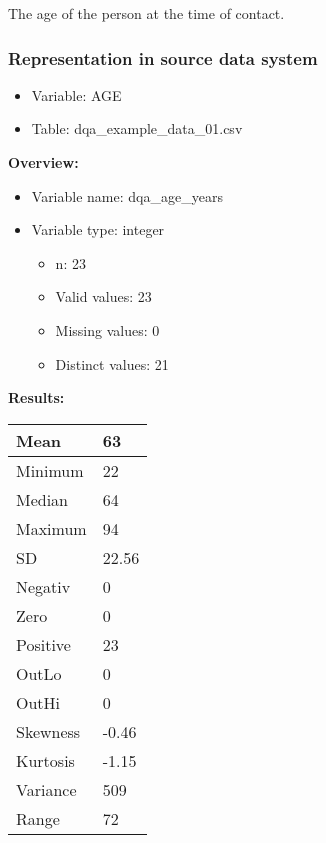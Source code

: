 \documentclass[
]{article}
\providecommand{\tightlist}{%
  \setlength{\itemsep}{0pt}\setlength{\parskip}{0pt}}
\begin{document}
The age of the person at the time of contact.

\hypertarget{representation-in-source-data-system}{%
\subsubsection{\texorpdfstring{Representation in \textbf{source} data
system}{Representation in source data system}}\label{representation-in-source-data-system}}

\begin{itemize}
\tightlist
\item
  Variable: AGE
\item
  Table: dqa\_example\_data\_01.csv
\end{itemize}

\textbf{Overview:}

\begin{itemize}
\tightlist
\item
  Variable name: dqa\_age\_years
\item
  Variable type: integer

  \begin{itemize}
  \tightlist
  \item
    n: 23
  \item
    Valid values: 23
  \item
    Missing values: 0
  \item
    Distinct values: 21
  \end{itemize}
\end{itemize}

\textbf{Results:}\\

\begin{table}[H]
\centering
\begin{tabular}{l|l}
\hline
Mean & 63\\
\hline
Minimum & 22\\
\hline
Median & 64\\
\hline
Maximum & 94\\
\hline
SD & 22.56\\
\hline
Negativ & 0\\
\hline
Zero & 0\\
\hline
Positive & 23\\
\hline
OutLo & 0\\
\hline
OutHi & 0\\
\hline
Skewness & -0.46\\
\hline
Kurtosis & -1.15\\
\hline
Variance & 509\\
\hline
Range & 72\\
\hline
\end{tabular}
\end{table}
\end{document}
